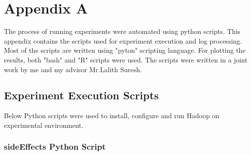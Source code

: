 
\chapter{Appendix A} %

\label{Used Scripts} %


The process of running experiments were automated using python scripts. This appendix contains the scripts used for experiment execution and log processing. Most of the scripts are written using "pyton" scripting language. For plotting the results, both "bash" and "R" scripts were used. The scripts were written in a joint work by me and my advisor Mr.Lalith Suresh. 


\section{Experiment Execution Scripts}
 Below Python scripts were used to install, configure and run Hadoop on experimental environment. 

\subsection{sideEffects Python Script}


